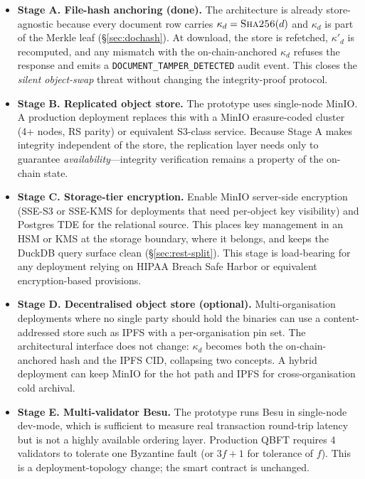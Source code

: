 \documentclass[10pt,twocolumn]{article}
\begin{document}
\begin{itemize}[leftmargin=*,topsep=3pt,itemsep=3pt]

\item \textbf{Stage A. File-hash anchoring (done).}
  The architecture is already store-agnostic because every
  document row carries
  $\kappa_d = \textsc{Sha256}(d)$
  and $\kappa_d$ is part of the Merkle leaf
  (\S\ref{sec:dochash}). At download, the store is refetched,
  $\kappa'_d$ is recomputed, and any mismatch with the
  on-chain-anchored $\kappa_d$ refuses the response and emits a
  \texttt{DOCUMENT\_TAMPER\_DETECTED} audit event. This closes
  the \emph{silent object-swap} threat without changing the
  integrity-proof protocol.

\item \textbf{Stage B. Replicated object store.}
  The prototype uses single-node MinIO. A production deployment
  replaces this with a MinIO erasure-coded cluster (4+ nodes, RS
  parity) or equivalent S3-class service. Because Stage A makes
  integrity independent of the store, the replication layer needs
  only to guarantee \emph{availability}---integrity verification
  remains a property of the on-chain state.

\item \textbf{Stage C. Storage-tier encryption.}
  Enable MinIO server-side encryption (SSE-S3 or SSE-KMS for
  deployments that need per-object key visibility) and Postgres
  TDE for the relational source. This places key management in
  an HSM or KMS at the storage boundary, where it belongs, and
  keeps the DuckDB query surface clean
  (\S\ref{sec:rest-split}). This stage is load-bearing for any
  deployment relying on HIPAA Breach Safe Harbor or equivalent
  encryption-based provisions.

\item \textbf{Stage D. Decentralised object store (optional).}
  Multi-organisation deployments where no single party should
  hold the binaries can use a content-addressed store such as
  IPFS with a per-organisation pin set. The architectural
  interface does not change: $\kappa_d$ becomes both the
  on-chain-anchored hash and the IPFS CID, collapsing two
  concepts. A hybrid deployment can keep MinIO for the hot path
  and IPFS for cross-organisation cold archival.

\item \textbf{Stage E. Multi-validator Besu.}
  The prototype runs Besu in single-node dev-mode, which is
  sufficient to measure real transaction round-trip latency but
  is not a highly available ordering layer. Production QBFT
  requires 4 validators to tolerate one Byzantine fault (or
  $3f+1$ for tolerance of $f$). This is a deployment-topology
  change; the smart contract is unchanged.

\end{itemize}
\end{document}
